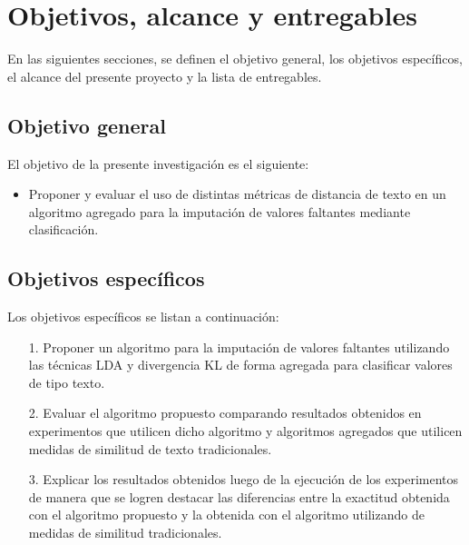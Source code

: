 \chapter{Objetivos, alcance y entregables}
En las siguientes secciones, se definen el objetivo general, los objetivos específicos, el alcance del presente proyecto y la lista de entregables. 

\section{Objetivo general}
El objetivo de la presente investigación es el siguiente:
\begin{itemize}
\item Proponer y evaluar el uso de distintas métricas de distancia de texto en un algoritmo agregado para la imputación de valores faltantes mediante clasificación.
\end{itemize}


\section{Objetivos específicos}
Los objetivos específicos se listan a continuación:
\begin{itemize}
\item [1.] Proponer un algoritmo para la imputación de valores faltantes utilizando las técnicas LDA y divergencia KL de forma agregada para clasificar valores de tipo texto.
\item [2.] Evaluar el algoritmo propuesto comparando resultados obtenidos en experimentos que utilicen dicho algoritmo y algoritmos agregados que utilicen medidas de similitud de texto tradicionales.
\item [3.] Explicar los resultados obtenidos luego de la ejecución de los experimentos de manera que se logren destacar las diferencias entre la exactitud obtenida con el algoritmo propuesto y la obtenida con el algoritmo utilizando de medidas de similitud tradicionales.
\end{itemize}
